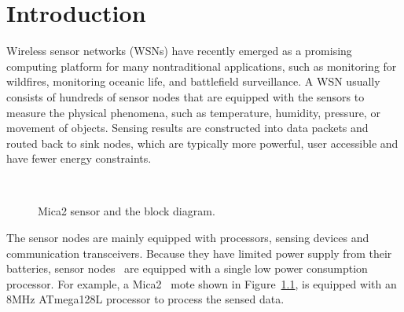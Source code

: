 \chapter{Introduction}\label{chap:intro}


Wireless sensor networks (WSNs) have recently emerged as a promising computing platform for many nontraditional 
applications, such as monitoring for wildfires, monitoring oceanic life, and battlefield surveillance. A WSN usually 
consists of hundreds of sensor nodes that are equipped with the sensors to measure the physical phenomena, such as 
temperature, humidity, pressure, or movement of objects. Sensing results are constructed into data packets and routed 
back to sink nodes, which are typically more powerful, user accessible and have fewer energy constraints.

\begin{figure}[h]
\centering
\mbox{
}
\caption{Mica2 sensor and the block diagram.}
\label{fig:mica2}
\end{figure}

The sensor nodes are mainly equipped with processors, sensing devices and communication transceivers. Because they have 
limited power supply from their batteries, sensor nodes~\cite{mica2-power, micaz-power,telos,telosb} are equipped with 
a single low power consumption processor. 
For example, a Mica2~\cite{mica2-power} mote shown in Figure~\ref{fig:mica2}, is equipped with an 8MHz ATmega128L 
processor to process the sensed data.

